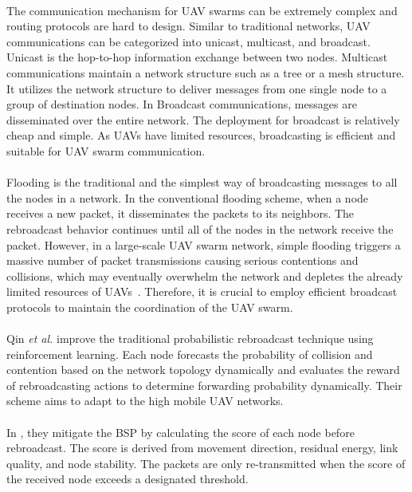 \documentclass[a4paper,12pt]{report}
\begin{document}
\paragraph{}
The communication mechanism for UAV swarms can be extremely complex and routing protocols are hard to design. Similar to traditional networks, UAV communications can be categorized into unicast, multicast, and broadcast. Unicast is the hop-to-hop information exchange between two nodes. Multicast communications maintain a network structure such as a tree or a mesh structure. It utilizes the network structure to deliver messages from one single node to a group of destination nodes. In Broadcast communications, messages are disseminated over the entire network. The deployment for broadcast is relatively cheap and simple. As UAVs have limited resources, broadcasting is efficient and suitable for UAV swarm communication. 

\paragraph{}
Flooding is the traditional and the simplest way of broadcasting messages to all the nodes in a network\cite{flooding}. In the conventional flooding scheme, when a node receives a new packet, it disseminates the packets to its neighbors. The rebroadcast behavior continues until all of the nodes in the network receive the packet. However, in a large-scale UAV swarm network, simple flooding triggers a massive number of packet transmissions causing serious contentions and collisions, which may eventually overwhelm the network and depletes the already limited resources of UAVs~\cite{tseng2002broadcast}. Therefore, it is crucial to employ efficient broadcast protocols to maintain the coordination of the UAV swarm. 

\paragraph{}
Qin {\it et al.}\cite{6} improve the traditional probabilistic rebroadcast technique using reinforcement learning. Each node forecasts the probability of collision and contention based on the network topology dynamically and evaluates the reward of rebroadcasting actions to determine forwarding probability dynamically. Their scheme aims to adapt to the high mobile UAV networks.

\paragraph{}
In \cite{9531630}, they mitigate the BSP by calculating the score of each node before rebroadcast. The score is derived from movement direction, residual energy, link quality, and node stability. The packets are only re-transmitted when the score of the received node exceeds a designated threshold. 
\end{document}
